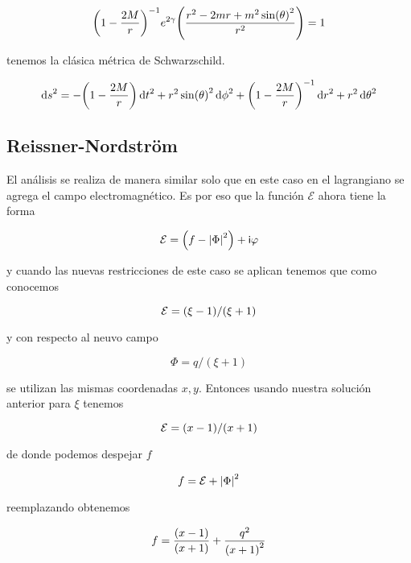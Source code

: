 \documentclass[../Main.tex]{subfiles}
\begin{document}
\begin{equation*}
    \qty(1-\dfrac{2M}{r})^{-1}e^{2\gamma}\qty(\dfrac{r^{2}-2mr+m^{2}\sin(\theta)^{2}}{r^{2}})=1
\end{equation*}

tenemos la clásica métrica de Schwarzschild.

\begin{equation}
    \dd{s}^{2} = -\qty(1-\dfrac{2M}{r})\dd{t}^{2}+r^{2}\sin(\theta)^{2}\dd{\phi}^{2}+\qty(1-\dfrac{2M}{r})^{-1}\dd{r}^{2}+r^{2}\dd{\theta}^{2}
\end{equation}

\subsection{Reissner-Nordström}
El análisis se realiza de manera similar solo que en este caso en el lagrangiano se agrega el campo electromagnético. Es por eso que la función $\mathcal{E}$ ahora tiene la forma

\begin{equation}
    \mathcal{E}=\qty(f-\abs{\Phi}^{2})+\mathsf{i}\varphi
\end{equation}

y cuando las nuevas restricciones de este caso se aplican tenemos que como conocemos

\begin{equation}
    \mathcal{E}=\qty(\xi-1)/\qty(\xi+1)
\end{equation}

y con respecto al neuvo campo

\begin{equation}
    \Phi=q/(\xi+1)
\end{equation}

se utilizan las mismas coordenadas $x,y$. Entonces usando nuestra solución anterior para $\xi$ tenemos

\begin{equation}
    \mathcal{E}=\qty(x-1)/\qty(x+1)
\end{equation}

de donde podemos despejar $f$

\begin{equation}
    f=\mathcal{E}+\abs{\Phi}^{2}
\end{equation}

reemplazando obtenemos

\begin{equation}
    f=\dfrac{\qty(x-1)}{\qty(x+1)}+\dfrac{q^{2}}{\qty(x+1)^{2}}
\end{equation}
\end{document}
